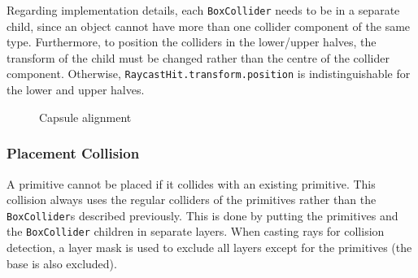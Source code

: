 \documentclass[a4paper, 12pt]{scrartcl}
\begin{document}
Regarding implementation details, each \texttt{BoxCollider} needs to be in a separate child, since an object cannot have more than one collider component of the same type. Furthermore, to position the colliders in the lower/upper halves, the transform of the child must be changed rather than the centre of the collider component. Otherwise, \texttt{RaycastHit.transform.position} is indistinguishable for the lower and upper halves.

\begin{figure}[htp]
  \centering
  \qquad
  \qquad
  \caption{Capsule alignment}
\end{figure}

\subsubsection{Placement Collision}
A primitive cannot be placed if it collides with an existing primitive. This collision always uses the regular colliders of the primitives rather than the \texttt{BoxCollider}s described previously. This is done by putting the primitives and the \texttt{BoxCollider} children in separate layers. When casting rays for collision detection, a layer mask is used to exclude all layers except for the primitives (the base is also excluded).
\end{document}
